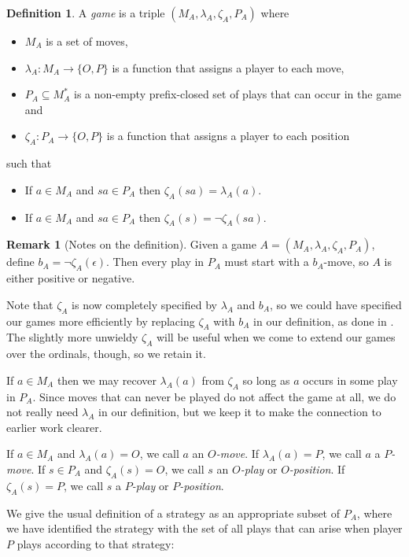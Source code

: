\documentclass[11pt]{article} %
\theoremstyle{plain} %
\theoremstyle{definition} %
\newtheorem{definition}[theorem]{Definition}
\newtheorem{remark}[theorem]{Remark}
\theoremstyle{note}
\theoremstyle{exercisestyle}
\newcommand*\from{\colon}
\newcommand{\cmap}[3]{#1\from{}#2\to{}#3}
\newcommand{\OP}{\{O,P\}}
\newcommand{\emptyplay}{\epsilon}
\renewcommand{\subset}{\subseteq}
\begin{document}
\begin{definition}
  A \emph{game} is a triple $(M_A,\lambda_A,\zeta_A,P_A)$ where
  \begin{itemize}
    \item $M_A$ is a set of moves,
    \item $\cmap{\lambda_A}{M_A}{\OP}$ is a function that assigns a player to each move,
    \item $P_A\subset M_A^*$ is a non-empty prefix-closed set of plays that can occur in the game and
    \item $\cmap{\zeta_A}{P_A}{\OP}$ is a function that assigns a player to each position
  \end{itemize}
  such that
  \begin{itemize}
    \item If $a\in M_A$ and $sa\in P_A$ then $\zeta_A(sa)=\lambda_A(a)$.
    \item If $a\in M_A$ and $sa\in P_A$ then $\zeta_A(s)=\neg\zeta_A(sa)$.
  \end{itemize}
\end{definition}

\begin{remark}[Notes on the definition]
  Given a game $A=(M_A,\lambda_A,\zeta_A,P_A)$, define $b_A=\neg\zeta_A(\emptyplay)$.  Then every play in $P_A$ must start with a $b_A$-move, so $A$ is either positive or negative.

  Note that $\zeta_A$ is now completely specified by $\lambda_A$ and $b_A$, so we could have specified our games more efficiently by replacing $\zeta_A$ with $b_A$ in our definition, as done in \cite{martinsthesis}.  The slightly more unwieldy $\zeta_A$ will be useful when we come to extend our games over the ordinals, though, so we retain it.

  If $a\in M_A$ then we may recover $\lambda_A(a)$ from $\zeta_A$ so long as $a$ occurs in some play in $P_A$.  Since moves that can never be played do not affect the game at all, we do not really need $\lambda_A$ in our definition, but we keep it to make the connection to earlier work clearer.

  If $a\in M_A$ and $\lambda_A(a)=O$, we call $a$ an \emph{$O$-move}.  If $\lambda_A(a)=P$, we call $a$ a \emph{$P$-move}.  If $s\in P_A$ and $\zeta_A(s)=O$, we call $s$ an \emph{$O$-play} or \emph{$O$-position}.  If $\zeta_A(s)=P$, we call $s$ a \emph{$P$-play} or \emph{$P$-position}.
\end{remark}

We give the usual definition of a strategy as an appropriate subset of $P_A$, where we have identified the strategy with the set of all plays that can arise when player $P$ plays according to that strategy:
\end{document}

